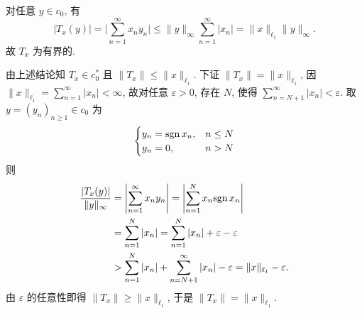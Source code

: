 \begin{enumerate}
\begin{answer}
\begin{enumerate}
        对任意 $y\in c_0$, 有
        \[|T_x(y)|=\biggl|\sum_{n=1}^{\infty} x_ny_n\biggr|\leq\|y\|_{\infty}\sum_{n=1}^{\infty}|x_n|=\|x\|_{\ell_1}\|y\|_{\infty}.\]
        故 $T_x$ 为有界的.
    
        由上述结论知 $T_x\in c_0^*$ 且 $\|T_x\|\leq\|x\|_{\ell_1}$. 下证 $\|T_x\|=\|x\|_{\ell_1}$,
        因 $\|x\|_{\ell_1}=\sum_{n=1}^{\infty}|x_n|<\infty$, 故对任意 $\varepsilon>0$, 存在 $N$,
        使得 $\sum_{n=N+1}^{\infty}|x_n|<\varepsilon$. 取 $y=(y_n)_{n\geq 1}\in c_0$ 为
        \[\begin{cases}
            y_n=\mathrm{sgn}\, x_n, & n\leq N \\
            y_n=0, & n>N
        \end{cases}\]
        则
        \begin{align*}
            \frac{|T_x(y)|}{\|y\|_{\infty}}
            & =\left|\sum_{n=1}^{\infty}x_ny_n\right|=\left|\sum_{n=1}^N x_n\mathrm{sgn}\, x_n\right| \\
            & =\sum_{n=1}^N |x_n|=\sum_{n=1}^N |x_n|+\varepsilon-\varepsilon \\
            & >\sum_{n=1}^N |x_n|+\sum_{n=N+1}^{\infty} |x_n|-\varepsilon=\|x\|_{\ell_1}-\varepsilon. 
        \end{align*}
        由 $\varepsilon$ 的任意性即得 $\|T_x\|\geq \|x\|_{\ell_1}$, 于是 $\|T_x\|=\|x\|_{\ell_1}$.
    

\end{enumerate}
\end{answer}
\end{enumerate}
